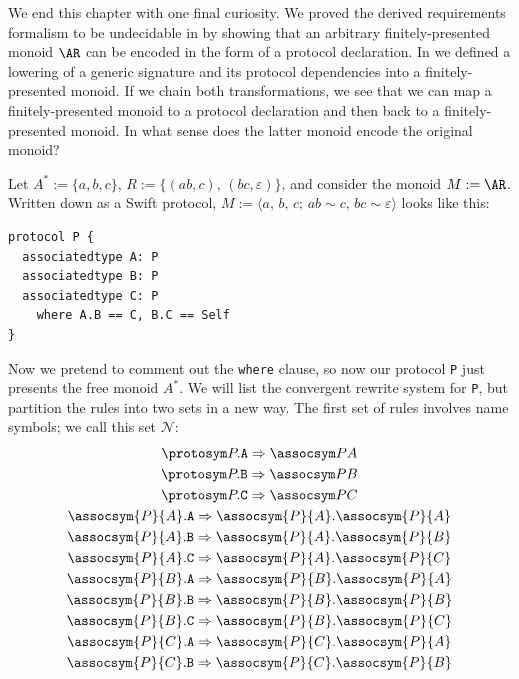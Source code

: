 \documentclass[../generics]{subfiles}
\begin{document}
\begin{example}\label{double encoding}
We end this chapter with one final curiosity. We proved the derived requirements formalism to be undecidable in  by showing that an arbitrary finitely-presented monoid $\AR$ can be encoded in the form of a protocol declaration. In  we defined a lowering of a generic signature and its protocol dependencies into a finitely-presented monoid. If we chain both transformations, we see that we can map a finitely-presented monoid to a protocol declaration and then back to a finitely-presented monoid. In what sense does the latter monoid encode the original monoid?

Let $A^*:=\{a,b,c\}$, $R:=\{(ab,c),\,(bc,\varepsilon)\}$, and consider the monoid $M:=\AR$. Written down as a Swift protocol, $M := \langle a,\,b,\,c;\,ab\sim c,\,bc\sim\varepsilon\rangle$ looks like this:
\begin{Verbatim}
protocol P {
  associatedtype A: P
  associatedtype B: P
  associatedtype C: P
    where A.B == C, B.C == Self
}
\end{Verbatim}
Now we pretend to comment out the \texttt{where} clause, so now our protocol \texttt{P} just presents the free monoid $A^*$. We will list the convergent rewrite system for \texttt{P}, but partition the rules into two sets in a new way. The first set of rules involves name symbols; we call this set $\mathcal{N}$:
\begin{gather*}
\AssocIntro{P}{A}\\
\AssocIntro{P}{B}\\
\AssocIntro{P}{C}\\
\assocsym{P}{A}.\texttt{A}\Rightarrow\assocsym{P}{A}.\assocsym{P}{A}\\
\assocsym{P}{A}.\texttt{B}\Rightarrow\assocsym{P}{A}.\assocsym{P}{B}\\
\assocsym{P}{A}.\texttt{C}\Rightarrow\assocsym{P}{A}.\assocsym{P}{C}\\
\assocsym{P}{B}.\texttt{A}\Rightarrow\assocsym{P}{B}.\assocsym{P}{A}\\
\assocsym{P}{B}.\texttt{B}\Rightarrow\assocsym{P}{B}.\assocsym{P}{B}\\
\assocsym{P}{B}.\texttt{C}\Rightarrow\assocsym{P}{B}.\assocsym{P}{C}\\
\assocsym{P}{C}.\texttt{A}\Rightarrow\assocsym{P}{C}.\assocsym{P}{A}\\
\assocsym{P}{C}.\texttt{B}\Rightarrow\assocsym{P}{C}.\assocsym{P}{B}\\

\end{gather*}
\end{example}
\end{document}
